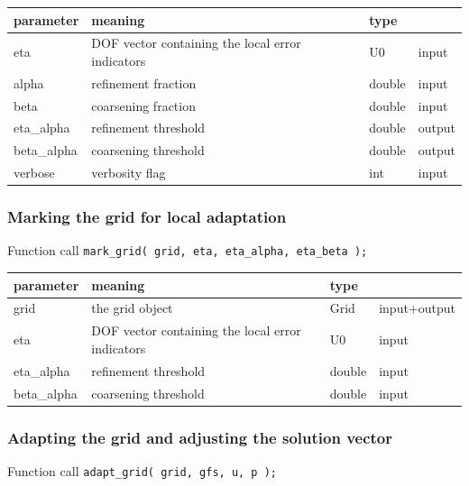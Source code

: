 \begin{tabular}{l|lll}
  parameter   & meaning                                          & type    &  \\
\hline
  eta         & DOF vector containing the local error indicators & U0      & input \\
  alpha       & refinement fraction                              & double  & input  \\
  beta        & coarsening fraction                              & double  & input  \\
  eta\_alpha  & refinement threshold                             & double  & output \\
  beta\_alpha & coarsening threshold                             & double  & output \\
  verbose     & verbosity flag                                   & int     & input  \\
\end{tabular}



\subsubsection*{Marking the grid for local adaptation}
\begin{block}{Function call}
  \lstinline{mark_grid( grid, eta, eta_alpha, eta_beta );}
\end{block}

\begin{tabular}{l|lll}
  parameter   & meaning                                          & type    &  \\
  \hline
  grid        & the grid object                                  & Grid    & input+output \\
  eta         & DOF vector containing the local error indicators & U0      & input \\
  eta\_alpha  & refinement threshold                             & double  & input \\
  beta\_alpha & coarsening threshold                             & double  & input \\
\end{tabular}


\subsubsection*{Adapting the grid and adjusting the solution vector}
\begin{block}{Function call}
  \lstinline{adapt_grid( grid, gfs, u, p );}
\end{block}

